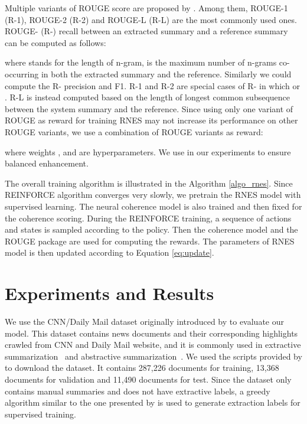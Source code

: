 \documentclass[letterpaper]{article} \usepackage{aaai18}  \usepackage{times}  \usepackage{helvet}  \usepackage{courier}  \usepackage{url}  \usepackage{graphicx}  \usepackage{amssymb}
\begin{document}
	Multiple variants of ROUGE score are proposed by \cite{rouge}. Among them, ROUGE-1 (R-1), ROUGE-2 (R-2) and ROUGE-L (R-L) are the most commonly used ones. ROUGE- (R-) recall between an extracted summary and a reference summary can be computed as follows:
	
	where  stands for the length of n-gram,  is the maximum number of n-grams co-occurring in both the extracted summary and the reference. Similarly we could compute the R- precision and F1. R-1 and R-2 are special cases of R- in which  or . R-L is instead computed based on the length of longest common subsequence between the system summary and the reference. Since using only one variant of ROUGE as reward for training RNES may not increase its performance on other ROUGE variants, we use a combination of ROUGE variants as reward:
	
	where weights ,  and  are hyperparameters. We use  in our experiments to ensure balanced enhancement.

	The overall training algorithm is illustrated in the Algorithm \ref{algo_rnes}. Since REINFORCE algorithm converges very slowly, we pretrain the RNES model with supervised learning. The neural coherence model is also trained and then fixed for the coherence scoring. During the REINFORCE training, a sequence of actions and states is sampled according to the policy. Then the coherence model and the ROUGE package are used for computing the rewards. The parameters of RNES model  is then updated according to Equation \ref{eq:update}. 
	
	
	\section{Experiments and Results}

	We use the CNN/Daily Mail dataset originally introduced by \cite{hermann_teaching_2015} to evaluate our model. This dataset contains news documents and their corresponding highlights crawled from CNN and Daily Mail website, and it is commonly used in extractive summarization~\cite{jianpeng2016,SummaRuNNer} and abstractive summarization~\cite{nallapati_ramesh_abstractive_2016,see_get_2017}. We used the scripts provided by \cite{hermann_teaching_2015} to download the dataset. It contains 287,226 documents for training, 13,368 documents for validation and 11,490 documents for test. Since the dataset only contains manual summaries and does not have extractive labels, a greedy algorithm similar to the one presented by \cite{SummaRuNNer} is used to generate extraction labels for supervised training.
\end{document}

